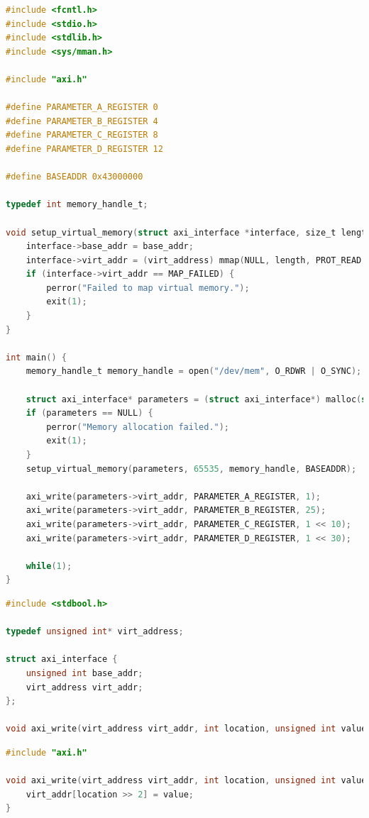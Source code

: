 \begin{lstlisting}[breaklines, language=C, label=lis:axi-dma-petalinux-main, caption=Obsługa modułu w trybie systemowym - \texttt{main.c}.]
#include <fcntl.h>
#include <stdio.h>
#include <stdlib.h>
#include <sys/mman.h>

#include "axi.h"

#define PARAMETER_A_REGISTER 0
#define PARAMETER_B_REGISTER 4
#define PARAMETER_C_REGISTER 8
#define PARAMETER_D_REGISTER 12

#define BASEADDR 0x43000000

typedef int memory_handle_t;

void setup_virtual_memory(struct axi_interface *interface, size_t length, memory_handle_t memory_handle, off_t base_addr) {
	interface->base_addr = base_addr;
	interface->virt_addr = (virt_address) mmap(NULL, length, PROT_READ | PROT_WRITE, MAP_SHARED, memory_handle, base_addr);
	if (interface->virt_addr == MAP_FAILED) {
		perror("Failed to map virtual memory.");
		exit(1);
	}
}

int main() {
	memory_handle_t memory_handle = open("/dev/mem", O_RDWR | O_SYNC);
	
	struct axi_interface* parameters = (struct axi_interface*) malloc(sizeof(struct axi_interface));
	if (parameters == NULL) {
		perror("Memory allocation failed.");
		exit(1);
	}
	setup_virtual_memory(parameters, 65535, memory_handle, BASEADDR);
	
	axi_write(parameters->virt_addr, PARAMETER_A_REGISTER, 1);
	axi_write(parameters->virt_addr, PARAMETER_B_REGISTER, 25);
	axi_write(parameters->virt_addr, PARAMETER_C_REGISTER, 1 << 10);
	axi_write(parameters->virt_addr, PARAMETER_D_REGISTER, 1 << 30);
	
	while(1);
}
\end{lstlisting}

\begin{lstlisting}[breaklines, language=C, label=lis:axi-dma-petalinux-axi-h, caption=Obsługa modułu w trybie systemowym - \texttt{axi.h}.]
#include <stdbool.h>

typedef unsigned int* virt_address;

struct axi_interface {
	unsigned int base_addr;
	virt_address virt_addr;
};

void axi_write(virt_address virt_addr, int location, unsigned int value);
\end{lstlisting}

\begin{lstlisting}[breaklines, language=C, label=lis:axi-dma-petalinux-axi-c, caption=Obsługa modułu w trybie systemowym - \texttt{axi.c}.]
#include "axi.h"

void axi_write(virt_address virt_addr, int location, unsigned int value) {
	virt_addr[location >> 2] = value;
}
\end{lstlisting}

